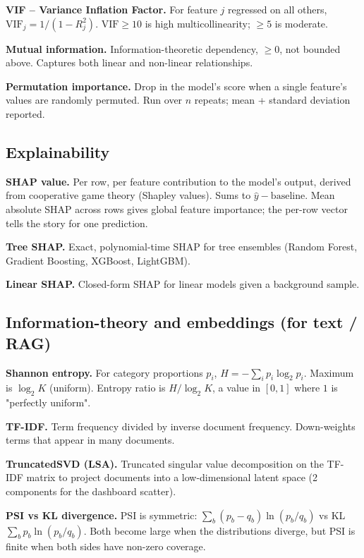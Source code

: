 \documentclass[11pt,a4paper]{article}
\begin{document}
\textbf{VIF -- Variance Inflation Factor.} For feature $j$ regressed on all
others, $\mathrm{VIF}_j = 1 / (1 - R^2_j)$. $\mathrm{VIF} \geq 10$ is high
multicollinearity; $\geq 5$ is moderate.

\textbf{Mutual information.} Information-theoretic dependency, $\geq 0$,
not bounded above. Captures both linear and non-linear relationships.

\textbf{Permutation importance.} Drop in the model's score when a single
feature's values are randomly permuted. Run over $n$ repeats; mean +
standard deviation reported.

\subsection{Explainability}

\textbf{SHAP value.} Per row, per feature contribution to the model's
output, derived from cooperative game theory (Shapley values). Sums to
$\hat{y} - \mathrm{baseline}$. Mean absolute SHAP across rows gives global
feature importance; the per-row vector tells the story for one prediction.

\textbf{Tree SHAP.} Exact, polynomial-time SHAP for tree ensembles
(Random Forest, Gradient Boosting, XGBoost, LightGBM).

\textbf{Linear SHAP.} Closed-form SHAP for linear models given a background
sample.

\subsection{Information-theory and embeddings (for text / RAG)}

\textbf{Shannon entropy.} For category proportions $p_i$,
$H = -\sum_i p_i \log_2 p_i$. Maximum is $\log_2 K$ (uniform). Entropy ratio
is $H / \log_2 K$, a value in $[0, 1]$ where $1$ is "perfectly uniform".

\textbf{TF-IDF.} Term frequency divided by inverse document frequency.
Down-weights terms that appear in many documents.

\textbf{TruncatedSVD (LSA).} Truncated singular value decomposition on the
TF-IDF matrix to project documents into a low-dimensional latent space
(2 components for the dashboard scatter).

\textbf{PSI vs KL divergence.} PSI is symmetric:
$\sum_b (p_b - q_b) \ln(p_b/q_b)$ vs KL $\sum_b p_b \ln(p_b/q_b)$. Both
become large when the distributions diverge, but PSI is finite when both
sides have non-zero coverage.
\end{document}
